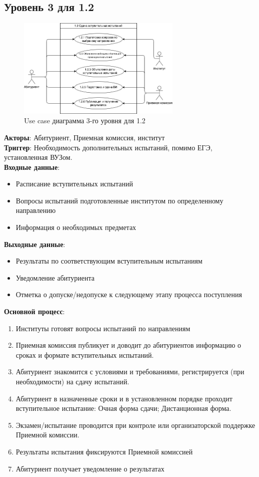 \documentclass[areasetadvanced]{scrartcl}
\begin{document}
\subsection{Уровень 3 для 1.2}
\begin{figure}[H]
    \centering
    \includegraphics[width=0.7\textwidth]{images/UseCase_3_12.png}
    \caption{Use case диаграмма 3-го уровня для 1.2}
    \label{fig:syntdiag}
\end{figure}
\textbf{Акторы}: Абитуриент, Приемная комиссия, институт \\
\textbf{Триггер}: Необходимость дополнительных испытаний, помимо ЕГЭ, установленная ВУЗом.\\
\textbf{Входные данные}:
\begin{itemize}
    \item Расписание вступительных испытаний
    \item Вопросы испытаний подготовленные институтом по определенному направлению
    \item Информация о необходимых предметах
\end{itemize}
\textbf{Выходные данные}:
\begin{itemize}
    \item Результаты по соответствующим вступительным испытаниям
    \item Уведомление абитуриента
    \item Отметка о допуске/недопуске к следующему этапу процесса поступления
\end{itemize}
\textbf{Основной процесс}:
\begin{enumerate}
    \item Институты готовят вопросы испытаний по направлениям
    \item Приемная комиссия публикует и доводит до абитуриентов информацию о сроках и формате вступительных испытаний.
    \item Абитуриент знакомится с условиями и требованиями, регистрируется (при необходимости) на сдачу испытаний.
    \item Абитуриент в назначенные сроки и в установленном порядке проходит вступительное испытание: 
    \subitem Очная форма сдачи;
    \subitem Дистанционная форма.
    \item Экзамен/испытание проводится при контроле или организаторской поддержке Приемной комиссии.
    \item Результаты испытания фиксируются Приемной комиссией  
    \item Абитуриент получает уведомление о результатах
\end{enumerate}
\end{document}
